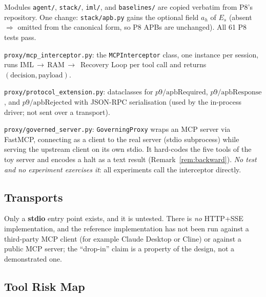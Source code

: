 \documentclass[11pt]{article}
\newcommand{\Es}{E_s}
\newcommand{\ahash}{a_h}   %
\begin{document}
\begin{description}[leftmargin=2em, topsep=4pt]
  \item[Frozen baseline (P7+P8).]
        Modules \texttt{agent/}, \texttt{stack/}, \texttt{iml/},
        and \texttt{baselines/} are copied verbatim from P8's
        repository. One change: \texttt{stack/apb.py} gains the optional
        field $\ahash$ of $\Es$ (absent $\Rightarrow$ omitted from the
        canonical form, so P8 APBs are unchanged). All 61 P8 tests pass.
  \item[Proxy layer (P9 new).]
        \texttt{proxy/mcp\_interceptor.py}: the \texttt{MCPInterceptor}
        class, one instance per session, runs IML\,$\to$\,RAM\,$\to$\,
        Recovery Loop per tool call and returns $(\text{decision},
        \text{payload})$.
  \item[Protocol extension.]
        \texttt{proxy/protocol\_extension.py}: dataclasses for
        $p9/\mathrm{apbRequired}$, $p9/\mathrm{apbResponse}$, and
        $p9/\mathrm{apbRejected}$ with JSON-RPC serialisation (used by the
        in-process driver; not sent over a transport).
  \item[Server entry point.]
        \texttt{proxy/governed\_server.py}: \texttt{GoverningProxy}
        wraps an MCP server via FastMCP, connecting as a client to the
        real server (stdio subprocess) while serving the upstream client
        on its own stdio. It hard-codes the five tools of the toy
        server and encodes a halt as a text result
        (Remark~\ref{rem:backward}). \emph{No test and no experiment
        exercises it}: all experiments call the interceptor directly.
\end{description}

\subsection{Transports}

Only a \textbf{stdio} entry point exists, and it is untested. There is
\emph{no} HTTP+SSE implementation, and the reference implementation has
not been run against a third-party MCP client (for example Claude
Desktop or Cline) or against a public MCP server; the ``drop-in''
claim is a property of the design, not a demonstrated one.

\subsection{Tool Risk Map}
\end{document}
